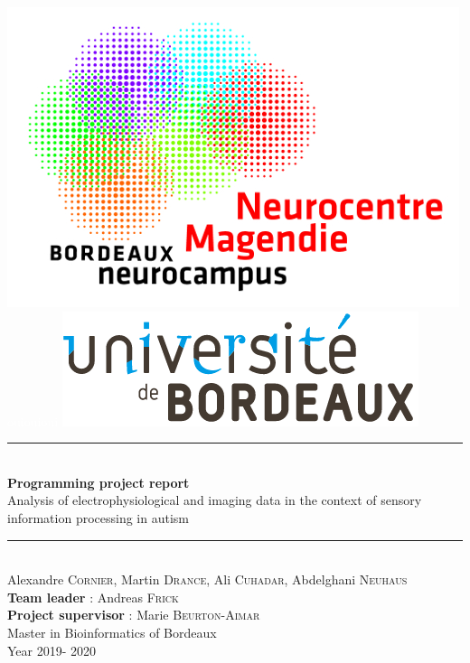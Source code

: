 \documentclass[a4paper,12pt]{report}
\begin{document}
\begin{center}
	\begin{center} \includegraphics[scale=1.2]{magendie.png} \textcolor{white}{ouiouioui}
	\includegraphics[scale=0.5]{logo-universite-bordeaux.png}\end{center} \vfill
	\rule{0.75\textwidth}{2 pt} \vspace{0.9\baselineskip} \\ 
	\huge \textbf{Programming project report} \vspace{0.5\baselineskip}\\
	Analysis of electrophysiological and imaging data in the context of sensory information processing in autism \normalsize  \vspace{0.9\baselineskip} \\
	\rule{0.75\textwidth}{2pt} \\\vfill
	\large Alexandre \textsc{Cornier}, Martin \textsc{Drance}, Ali \textsc{Cuhadar}, Abdelghani \textsc{Neuhaus} \vspace{1.2\baselineskip}\\
	\textbf{Team leader} : Andreas \textsc{Frick}\\		
	\textbf{Project supervisor} : Marie \textsc{Beurton-Aimar} \vspace{1.2\baselineskip}\\
    \large{Master in Bioinformatics of Bordeaux}\\
    Year 2019- 2020 \\
    
	\thispagestyle{empty}
\end{center}
\end{document}
